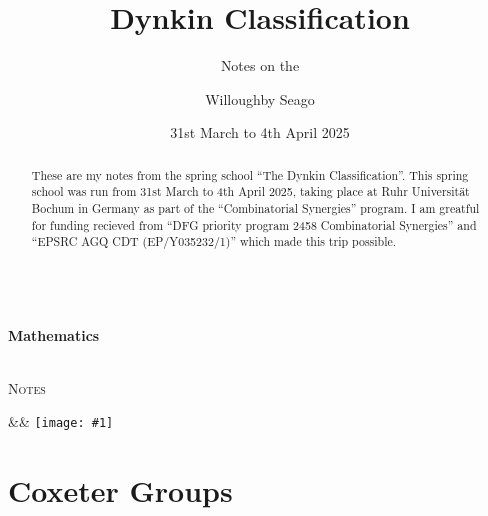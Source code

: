 \documentclass[fleqn, a4paper, openany]{memoir}
\title{Dynkin Classification}
\author{Willoughby Seago}
\date{31st March to 4th April 2025}
\subtitle{Notes on the}
\makeatletter
\newcommand{\@subtitle}{Mathematics}
\newcommand{\@subsubtitle}{Notes}
\newcommand{\titlepage}{%
    \begin{titlingpage}
        \begingroup%
        \raggedleft
        \vspace*{\baselineskip}
        {\LARGE \theauthor}\\[0.167\textheight]
        {\large\bfseries \@subtitle}\\[\baselineskip]
        {\HUGE\bfseries\textcolor{gray}{\thetitle}}\\[\baselineskip]
        {\large\thedate}\par
        \vspace*{2\baselineskip}
        \vfill
        {\LARGE\scshape \@subsubtitle}\par
        \vspace*{3\baselineskip}
        \endgroup
    \end{titlingpage}
}
\newcommand{\innertitlepage}[1]{%
    \maketitle  %
    \begin{abstract}  %
        \abstracttext
    \end{abstract}
    \begingroup\centering
    \vfill
    \ifx&#1&%
    \else
    \texttt{[image: \#1]}
    \fi
    \vfill
    \endgroup
}
\newcommand{\abstracttext}{These are my notes from the spring school \enquote{The Dynkin Classification}. This spring school was run from 31st March to 4th April 2025, taking place at Ruhr Universit\"at Bochum in Germany as part of the \enquote{Combinatorial Synergies} program. I am greatful for funding recieved from \enquote{DFG priority program 2458 Combinatorial Synergies} and \enquote{EPSRC AGQ CDT (EP/Y035232/1)} which made this trip possible.}
\makeatother
\begin{document}
    \frontmatter
    \titlepage
    \innertitlepage{}
    \newpage
    \tableofcontents
    \mainmatter
    
    
    
    \chapter{Coxeter Groups}
\end{document}
